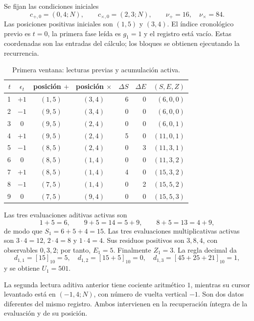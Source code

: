 Se fijan las condiciones iniciales
\[
 c_{+,0}=(0,4;N),\qquad c_{\times,0}=(2,3;N),
 \qquad \nu_+=16,\quad\nu_\times=84.
\]
Las posiciones positivas iniciales son \((1,5)\) y \((3,4)\). El índice
cronológico previo es \(t=0\), la primera fase leída es \(g_1=1\) y el
registro está vacío. Estas coordenadas son las entradas
del cálculo; los bloques se obtienen ejecutando la recurrencia.

\begin{table}[htbp]
\caption{Primera ventana: lecturas previas y acumulación activa.}
\label{act21:tpk:tabla-501}
\small
\begin{tabular}{@{}rcccrrr@{}}
\toprule
\(t\)&\(\epsilon_t\)&posición \(+\)&posición \(\times\)&
\(\Delta S\)&\(\Delta E\)&\((S,E,Z)\)\\
\midrule
1&\(+1\)&\((1,5)\)&\((3,4)\)&6&0&\((6,0,0)\)\\
2&\(-1\)&\((9,5)\)&\((3,4)\)&0&0&\((6,0,0)\)\\
3&0&\((9,5)\)&\((2,4)\)&0&0&\((6,0,1)\)\\
4&\(+1\)&\((9,5)\)&\((2,4)\)&5&0&\((11,0,1)\)\\
5&\(-1\)&\((8,5)\)&\((2,4)\)&0&3&\((11,3,1)\)\\
6&0&\((8,5)\)&\((1,4)\)&0&0&\((11,3,2)\)\\
7&\(+1\)&\((8,5)\)&\((1,4)\)&4&0&\((15,3,2)\)\\
8&\(-1\)&\((7,5)\)&\((1,4)\)&0&2&\((15,5,2)\)\\
9&0&\((7,5)\)&\((9,4)\)&0&0&\((15,5,3)\)\\
\bottomrule
\end{tabular}
\end{table}

Las tres evaluaciones aditivas activas son
\[
 1+5=6,\qquad9+5=14=5+9,\qquad8+5=13=4+9,
\]
de modo que \(S_1=6+5+4=15\). Las tres evaluaciones multiplicativas activas
son \(3\cdot4=12\), \(2\cdot4=8\) y \(1\cdot4=4\). Sus residuos
positivos son \(3,8,4\), con observables \(0,3,2\); por tanto,
\(E_1=5\). Finalmente \(Z_1=3\). La regla decimal da
\[
 d_{1,1}=[15]_{10}=5,\quad
 d_{1,2}=[15+5]_{10}=0,\quad
 d_{1,3}=[45+25+21]_{10}=1,
\]
y se obtiene \(U_1=501\).

La segunda lectura aditiva anterior tiene cociente aritmético \(1\),
mientras su cursor levantado está en \((-1,4;N)\), con número de vuelta
vertical \(-1\). Son dos datos diferentes del mismo registro. Ambos
intervienen en la recuperación íntegra de la evaluación y de su posición.

